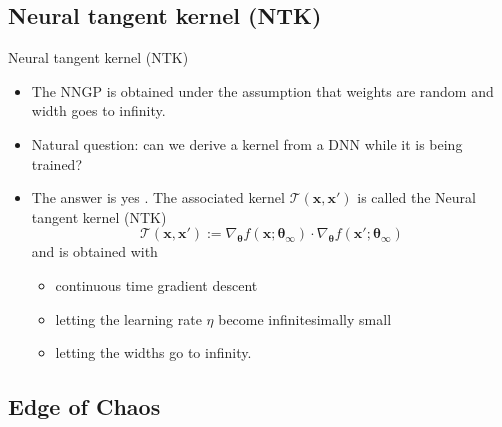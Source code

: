 \documentclass[9pt]{beamer}
\begin{document}
\subsection{Neural tangent kernel (NTK)}

\begin{frame}{Neural tangent kernel (NTK)}
\begin{itemize}
	\item The NNGP is obtained under the assumption that weights are random and width goes to infinity.
	\item Natural question: can we derive a kernel from a DNN while it is being trained?
	\item The answer is yes \citep{jacot2018neural}. The associated kernel $\mathcal{T}(\boldsymbol{x},\boldsymbol{x}')$ is called the \alert{Neural tangent kernel} (NTK)
	$$\mathcal{T}(\boldsymbol{x},\boldsymbol{x}') := \nabla_{\boldsymbol{\theta}}f(\boldsymbol{x}; \boldsymbol{\theta_\infty})\cdot \nabla_{\boldsymbol{\theta}}f(\boldsymbol{x}'; \boldsymbol{\theta_\infty})$$
	and is obtained with 
	\begin{itemize}
		\item continuous time gradient descent
		\item letting the learning rate $\eta$ become infinitesimally small
		\item letting the widths go to infinity.
	\end{itemize}
\end{itemize}
\end{frame}



\subsection{Edge of Chaos}
\end{document}
